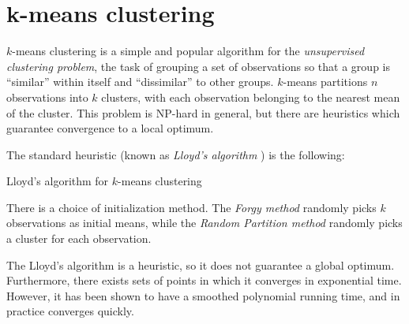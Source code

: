 \documentclass[../tech_report_1.tex]{subfiles}
\begin{document}
\section{k-means clustering}

$k$-means clustering is a simple and popular algorithm for the \textit{unsupervised clustering
problem}, the task of grouping a set of observations so that a group
is ``similar'' within itself and ``dissimilar'' to other groups.
$k$-means partitions $n$ observations into $k$ clusters, with each
observation belonging to the nearest mean of the cluster. This problem
is NP-hard in general, but there are heuristics which guarantee convergence
to a local optimum.

The standard heuristic (known as \textit{Lloyd's algorithm}  \cite{llyod1982kmeans}) is the
following:

\begin{algorithm}
\caption{Lloyd's algorithm for $k$-means clustering}


\begin{algorithmic}[1]
\EndWhile
\end{algorithmic} 
\end{algorithm}


There is a choice of initialization method. The \textit{Forgy method}
randomly picks $k$ observations as initial means, while the \textit{Random
Partition method} randomly picks a cluster for each observation.

The Lloyd's algorithm is a heuristic, so it does not guarantee a global
optimum. Furthermore, there exists sets of points in which it converges
in exponential time. However, it has been shown to have a smoothed
polynomial running time, and in practice converges quickly.
\end{document}
